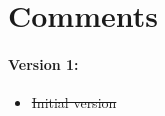 \documentclass[../HDF5_RFC.tex]{subfiles}
\begin{document}
\section{Comments}

\paragraph{Version 1:}
\begin{itemize}
\item \sout{Initial version}
\end{itemize}
\end{document}
